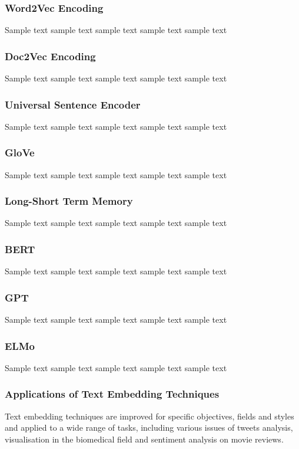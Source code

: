 \subsubsection{Word2Vec Encoding}
Sample text sample text sample text sample text sample text

\subsubsection{Doc2Vec Encoding}
Sample text sample text sample text sample text sample text

\subsubsection{Universal Sentence Encoder}
Sample text sample text sample text sample text sample text

\subsubsection{GloVe}
Sample text sample text sample text sample text sample text

\subsubsection{Long-Short Term Memory}
Sample text sample text sample text sample text sample text

\subsubsection{BERT}
Sample text sample text sample text sample text sample text

\subsubsection{GPT}
Sample text sample text sample text sample text sample text

\subsubsection{ELMo}
Sample text sample text sample text sample text sample text

\subsubsection{Applications of Text Embedding Techniques}
Text embedding techniques are improved for specific objectives, fields and styles and applied to a wide range of tasks, including various issues of tweets analysis\cite{mottaghinia2021}, visualisation in the biomedical field\cite{oubenali2022} and sentiment analysis on movie reviews\cite{sivakumar2021}.

